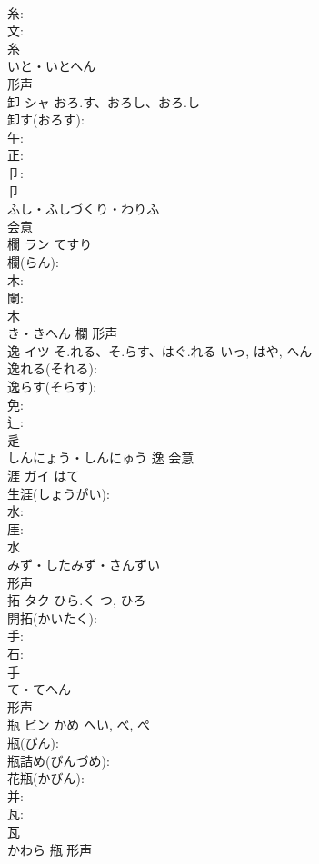 \documentclass[8pt]{extreport}
\begin{document}
\begin{CJK}{UTF8}{min}
\\	糸: 
\\	文: 
\\	糸	
\\	いと・いとへん	
\\	形声 
\\	卸	シャ	おろ.す、おろし、おろ.し		
\\	卸す(おろす): 
\\	午: 
\\	正: 
\\	卩: 
\\	卩	
\\	ふし・ふしづくり・わりふ	
\\	会意 
\\	欄	ラン	てすり		
\\	欄(らん): 
\\	木: 
\\	闌: 
\\	木	
\\	き・きへん	欄	形声 
\\	逸	イツ	そ.れる、そ.らす、はぐ.れる	いっ, はや, へん	
\\	逸れる(それる): 
\\	逸らす(そらす): 
\\	免: 
\\	辶: 
\\	辵	
\\	しんにょう・しんにゅう	逸	会意 
\\	涯	ガイ	はて		
\\	生涯(しょうがい): 
\\	水: 
\\	厓: 
\\	水	
\\	みず・したみず・さんずい	
\\	形声 
\\	拓	タク	ひら.く	つ, ひろ	
\\	開拓(かいたく): 
\\	手: 
\\	石: 
\\	手	
\\	て・てへん	
\\	形声 
\\	瓶	ビン	かめ	へい, べ, ぺ	
\\	瓶(びん): 
\\	瓶詰め(びんづめ): 
\\	花瓶(かびん): 
\\	并: 
\\	瓦: 
\\	瓦	
\\	かわら	甁	形声 

\end{CJK}
\end{document}
